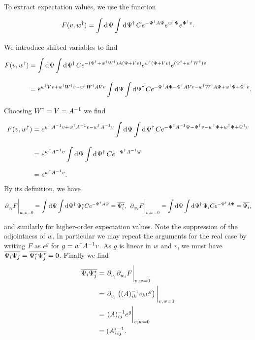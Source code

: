 To extract expectation values, we use the function
\begin{align*}
	F(v, w^{\dagger}) = \int\limits_{}^{}\dd[]{\Psi}\int\limits_{}^{}\dd[]{\Psi\ensuremath{^{\dagger}}}Ce^{-\Psi^{\dagger} A\Psi}e^{w^{\dagger}\Psi}e^{\Psi^{\dagger} v}.
\end{align*}
We introduce shifted variables to find
\begin{align*}
	F(v, w^{\dagger}) &= \int\limits_{}^{}\dd[]{\Psi}\int\limits_{}^{}\dd[]{\Psi\ensuremath{^{\dagger}}}Ce^{-(\Psi^{\dagger} + w^{\dagger} W^{\dagger})A(\Psi + Vv)}e^{w^{\dagger}(\Psi + Vv)}e^{(\Psi^{\dagger} + w^{\dagger} W^{\dagger})v} \\
	        &= e^{w^{\dagger} Vv+ w^{\dagger} W^{\dagger} v - w^{\dagger} W^{\dagger} AVv}\int\limits_{}^{}\dd[]{\Psi}\int\limits_{}^{}\dd[]{\Psi\ensuremath{^{\dagger}}}Ce^{-\Psi^{\dagger} A\Psi - \Psi^{\dagger} AVv - w^{\dagger} W^{\dagger} A\Psi + w^{\dagger}\Psi + \Psi^{\dagger} v}.
\end{align*}
Choosing $W^{\dagger} = V = A^{-1}$ we find
\begin{align*}
	F(v, w^{\dagger}) &= e^{w^{\dagger} A^{-1}v + w^{\dagger} A^{-1}v - w^{\dagger} A^{-1}v}\int\limits_{}^{}\dd[]{\Psi}\int\limits_{}^{}\dd[]{\Psi\ensuremath{^{\dagger}}}Ce^{-\Psi^{\dagger} A^{-1}\Psi - \Psi^{\dagger} v - w^{\dagger} \Psi + w^{\dagger}\Psi + \Psi^{\dagger} v} \\
	        &= e^{w^{\dagger} A^{-1}v}\int\limits_{}^{}\dd[]{\Psi}\int\limits_{}^{}\dd[]{\Psi\ensuremath{^{\dagger}}}Ce^{-\Psi^{\dagger} A^{-1}\Psi} \\
	        &= e^{w^{\dagger} A^{-1}v}.
\end{align*}
By its definition, we have
\begin{align*}
	\eval{\del{}{v_{i}}F}_{w, v = 0} = \integ{}{}{\Psi}{\integ{}{}{\Psi\adj}{\Psi_{i}\cc Ce^{-\Psi\adj A\Psi}}} = \overline{\Psi_{i}\cc},\ \eval{\del{}{w_{i}}F}_{v, w = 0} = \integ{}{}{\Psi}{\integ{}{}{\Psi\adj}{\Psi_{i}Ce^{-\Psi\adj A\Psi}}} = \overline{\Psi_{i}},
\end{align*}
and similarly for higher-order expectation values. Note the suppression of the adjointness of $w$. In particular we may repeat the arguments for the real case by writing $F$ as $e^{g}$ for $g = w^{\dagger} A^{-1}v$. As $g$ is linear in $w$ and $v$, we must have $\overline{\Psi_{i}\Psi_{j}} = \overline{\Psi_{i}^{\star}\Psi_{j}^{\star}} = 0$. Finally we find
\begin{align*}
	\overline{\Psi_{i}\Psi_{j}\cc} &= \eval{\del{}{v_{j}}\del{}{w_{i}}F}_{v, w = 0} \\
	                               &= \eval{\del{}{v_{j}}\left((A)^{-1}_{ik}v_{k}e^{g}\right)}_{v, w = 0} \\
	                               &= \eval{(A)^{-1}_{ij}e^{g}}_{v, w = 0} \\
	                               &= (A)^{-1}_{ij}.
\end{align*}

